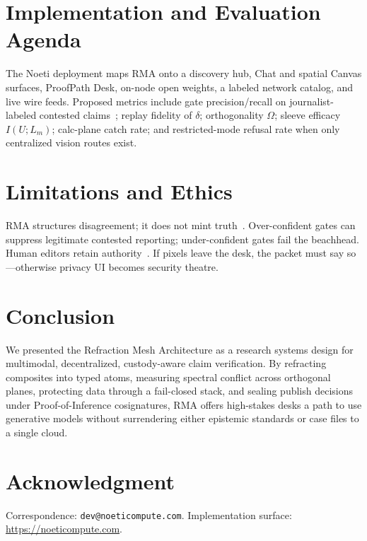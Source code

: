 \documentclass[journal,10pt,twocolumn,a4paper]{IEEEtran}
\begin{document}
\section{Implementation and Evaluation Agenda}
\label{sec:impl}

The Noeti deployment maps RMA onto a discovery hub, Chat and spatial Canvas surfaces, ProofPath Desk, on-node open weights, a labeled network catalog, and live wire feeds.
Proposed metrics include gate precision/recall on journalist-labeled contested claims~\cite{thorne2018fever}; replay fidelity of $\delta$; orthogonality $\Omega$; sleeve efficacy $I(U;L_m)$; calc-plane catch rate; and restricted-mode refusal rate when only centralized vision routes exist.

\section{Limitations and Ethics}
\label{sec:ethics}

RMA structures disagreement; it does not mint truth~\cite{graves2017fact}.
Over-confident gates can suppress legitimate contested reporting; under-confident gates fail the beachhead.
Human editors retain authority~\cite{silverman2015verification}.
If pixels leave the desk, the packet must say so---otherwise privacy UI becomes security theatre.

\section{Conclusion}
\label{sec:concl}

We presented the Refraction Mesh Architecture as a research systems design for multimodal, decentralized, custody-aware claim verification.
By refracting composites into typed atoms, measuring spectral conflict across orthogonal planes, protecting data through a fail-closed stack, and sealing publish decisions under Proof-of-Inference cosignatures, RMA offers high-stakes desks a path to use generative models without surrendering either epistemic standards or case files to a single cloud.

\section*{Acknowledgment}
Correspondence: \texttt{dev@noeticompute.com}. Implementation surface: \url{https://noeticompute.com}.



\end{document}
